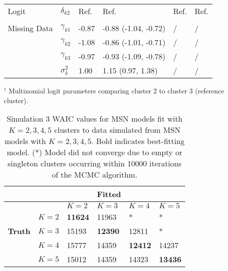 \documentclass[useAMS,11pt]{article}
\newcommand{\1}{\mathbbm{1}}
\begin{document}
\begin{table}[t]
\begin{center}
\begin{tabular}{llllll}
Logit & $\delta_{k2}$ &Ref. & Ref. & Ref. & Ref.\\
\addlinespace[0.2em]
\multicolumn{5}{l}{\textbf{ }}\\
Missing Data & $\gamma_{k1}$ & -0.87 & -0.88 (-1.04, -0.72) &  / & / \\
& $\gamma_{k2}$ & -1.08 & -0.86 (-1.01, -0.71) & / & / \\
& $\gamma_{k3}$ & -0.97 & -0.93 (-1.09, -0.78)& / & / \\
& $\sigma^2_{k}$ & 1.00 & 1.15 (0.97, 1.38) & / & / \\
\bottomrule
\end{tabular}\vspace{-.25cm}
\end{center}
\hspace{.80cm}$^{\dagger}$ Multinomial logit parameters comparing cluster 2 to cluster 3 (reference cluster).
\end{table}

\begin{table}[!htb]
\centering
\caption{\label{tab:sim3} Simulation 3 WAIC values for MSN models fit with $K = 2,3,4,5$ clusters to data simulated from MSN models with $K = 2,3,4,5$. Bold indicates best-fitting model. (*) Model did not converge due to empty or singleton clusters occurring within 10000 iterations of the MCMC algorithm.}
\begin{tabular}{@{}llllll@{}}
\toprule
 &  &  & \textbf{Fitted} &  &  \\ \midrule
 &  & $K = 2$ & $K = 3$ & $K = 4$ & $K = 5$ \\
 & $K = 2$ & \textbf{11624} & 11963  & * & * \\
\textbf{Truth} & $K = 3$ & 15193  & \textbf{12390}  & 12811  & * \\
 & $K = 4$ & 15777  & 14359 & \textbf{12412} & 14237  \\
 & $K = 5$ & 15012  & 14359  & 14323 & \textbf{13436} \\ \bottomrule
\end{tabular}
\end{table}
\end{document}
